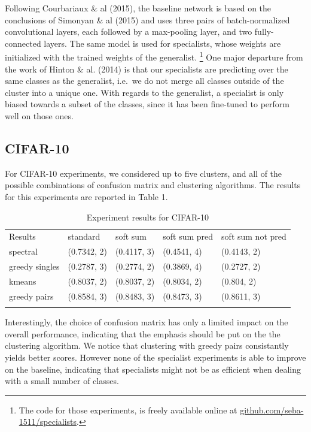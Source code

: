 \documentclass[12pt]{article}
\begin{document}
Following Courbariaux \& al (2015), the baseline network is based on the
conclusions of Simonyan \& al (2015) and uses three pairs of
batch-normalized convolutional layers, each followed by a max-pooling
layer, and two fully-connected layers. The same model is used for
specialists, whose weights are initialized with the trained weights of
the generalist. \footnote{The code for those experiments, is freely
  available online at
  \href{http://www.github.com/seba-1511/specialists}{github.com/seba-1511/specialists}.}
One major departure from the work of Hinton \& al. (2014) is that our
specialists are predicting over the same classes as the generalist,
i.e.~we do not merge all classes outside of the cluster into a unique
one. With regards to the generalist, a specialist is only biased towards
a subset of the classes, since it has been fine-tuned to perform well on
those ones.

\subsection{CIFAR-10}\label{cifar-10}

For CIFAR-10 experiments, we considered up to five clusters, and all of
the possible combinations of confusion matrix and clustering algorithms.
The results for this experiments are reported in Table 1.

\begin{longtable}[c]{@{}lllll@{}}
\toprule\addlinespace
Results & standard & soft sum & soft sum pred & soft sum not pred
\\\addlinespace
\midrule\endhead
spectral & (0.7342, 2) & (0.4117, 3) & (0.4541, 4) & (0.4143, 2)
\\\addlinespace
greedy singles & (0.2787, 3) & (0.2774, 2) & (0.3869, 4) & (0.2727, 2)
\\\addlinespace
kmeans & (0.8037, 2) & (0.8037, 2) & (0.8034, 2) & (0.804, 2)
\\\addlinespace
greedy pairs & (0.8584, 3) & (0.8483, 3) & (0.8473, 3) & (0.8611, 3)
\\\addlinespace
\bottomrule
\addlinespace
\caption{Experiment results for CIFAR-10}
\end{longtable}

Interestingly, the choice of confusion matrix has only a limited impact
on the overall performance, indicating that the emphasis should be put
on the the clustering algorithm. We notice that clustering with greedy
pairs consistantly yields better scores. However none of the specialist
experiments is able to improve on the baseline, indicating that
specialists might not be as efficient when dealing with a small number
of classes.
\end{document}
